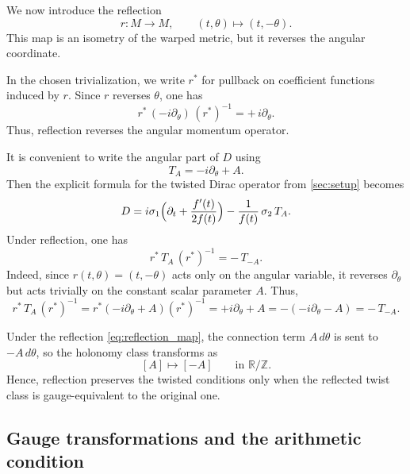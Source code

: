 \documentclass[11pt]{article}
\theoremstyle{definition}
\numberwithin{equation}{section}
\begin{document}
We now introduce the reflection
\begin{equation}\label{eq:reflection_map}
r:M\longrightarrow M,
\qquad
(t,\theta) \longmapsto (t,-\theta).
\end{equation}
This map is an isometry of the warped metric, but it reverses the angular coordinate.

In the chosen trivialization, we write $r^* $
for pullback on coefficient functions induced by \(r\). Since \(r\) reverses \(\theta\), one has
\begin{equation}\label{eq:reflection_on_angular_momentum}
r^*\,(-i\partial_\theta)\,(r^*)^{-1}=+\,i\partial_\theta.
\end{equation}
Thus, reflection reverses the angular momentum operator.

It is convenient to write the angular part of \(D\) using
\begin{equation}\label{eq:Ta_def}
T_A=-i\partial_\theta+A.
\end{equation}
Then the explicit formula for the twisted Dirac operator from \autoref{sec:setup} becomes
\begin{equation}\label{eq:D_as_TA}
D
=
i\sigma_1\Bigl(\partial_t+\frac{f'(t)}{2f(t)}\Bigr)
-
\frac{1}{f(t)}\,\sigma_2\,T_A.
\end{equation}
Under reflection, one has
\begin{equation}\label{eq:rstar_TA}
r^*\,T_A\,(r^*)^{-1}
=
-\,T_{-A}.
\end{equation}
Indeed, since \(r(t,\theta)=(t,-\theta)\) acts only on the angular variable, it reverses \(\partial_\theta\) but acts trivially on the constant scalar parameter \(A\). Thus,
\begin{equation}\label{eq:rstar_TA_calc}
r^*\,T_A\,(r^*)^{-1}
=
r^*(-i\partial_\theta+A)(r^*)^{-1}
=
+i\partial_\theta+A
=
-(-i\partial_\theta-A)
=
-\,T_{-A}.
\end{equation}


Under the reflection \eqref{eq:reflection_map}, the connection term \(A\,d\theta\) is sent to \(-A\,d\theta\), so the holonomy class transforms as
\begin{equation}\label{eq:holonomy_reflection}
[A]\longmapsto [-A]
\qquad
\text{in }\mathbb R/\mathbb Z.
\end{equation}
Hence, reflection preserves the twisted conditions only when the reflected twist class is gauge-equivalent to the original one.

\subsection{Gauge transformations and the arithmetic condition}
\end{document}
